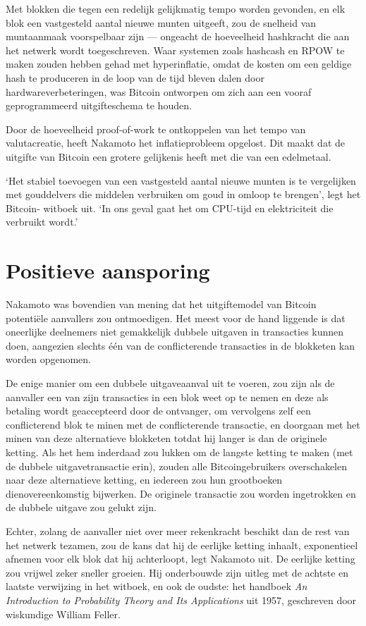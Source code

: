 \documentclass[
  a5paper,
  smalldemyvopaper,11pt,twoside,onecolumn,openright,extrafontsizes,
hidelinks]{memoir}
\begin{document}
Met blokken die tegen een redelijk gelijkmatig tempo worden gevonden, en
elk blok een vastgesteld aantal nieuwe munten uitgeeft, zou de snelheid
van muntaanmaak voorspelbaar zijn --- ongeacht de hoeveelheid hashkracht
die aan het netwerk wordt toegeschreven. Waar systemen zoals hashcash en
RPOW te maken zouden hebben gehad met hyperinflatie, omdat de kosten om
een geldige hash te produceren in de loop van de tijd bleven dalen door
hardwareverbeteringen, was Bitcoin ontworpen om zich aan een vooraf
geprogrammeerd uitgifteschema te houden.

Door de hoeveelheid proof-of-work te ontkoppelen van het tempo van
valutacreatie, heeft Nakamoto het inflatieprobleem opgelost. Dit maakt
dat de uitgifte van Bitcoin een grotere gelijkenis heeft met die van een
edelmetaal.

`Het stabiel toevoegen van een vastgesteld aantal nieuwe munten is te
vergelijken met gouddelvers die middelen verbruiken om goud in omloop te
brengen', legt het Bitcoin- witboek uit. `In ons geval gaat het om
CPU-tijd en elektriciteit die verbruikt wordt.'

\section{Positieve aansporing}\label{positieve-aansporing}

Nakamoto was bovendien van mening dat het uitgiftemodel van Bitcoin
potentiële aanvallers zou ontmoedigen. Het meest voor de hand liggende
is dat oneerlijke deelnemers niet gemakkelijk dubbele uitgaven in
transacties kunnen doen, aangezien slechts één van de conflicterende
transacties in de blokketen kan worden opgenomen.

De enige manier om een dubbele uitgaveaanval uit te voeren, zou zijn als
de aanvaller een van zijn transacties in een blok weet op te nemen en
deze als betaling wordt geaccepteerd door de ontvanger, om vervolgens
zelf een conflicterend blok te minen met de conflicterende transactie,
en doorgaan met het minen van deze alternatieve blokketen totdat hij
langer is dan de originele ketting. Als het hem inderdaad zou lukken om
de langste ketting te maken (met de dubbele uitgavetransactie erin),
zouden alle Bitcoingebruikers overschakelen naar deze alternatieve
ketting, en iedereen zou hun grootboeken dienovereenkomstig bijwerken.
De originele transactie zou worden ingetrokken en de dubbele uitgave zou
gelukt zijn.

Echter, zolang de aanvaller niet over meer rekenkracht beschikt dan de
rest van het netwerk tezamen, zou de kans dat hij de eerlijke ketting
inhaalt, exponentieel afnemen voor elk blok dat hij achterloopt, legt
Nakamoto uit. De eerlijke ketting zou vrijwel zeker sneller groeien. Hij
onderbouwde zijn uitleg met de achtste en laatste verwijzing in het
witboek, en ook de oudste: het handboek \emph{An Introduction to
Probability Theory and Its Applications} uit 1957, geschreven door
wiskundige William Feller.
\end{document}
